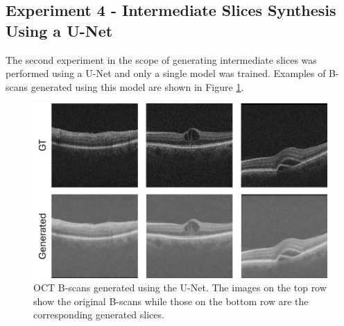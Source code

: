 \subsection{Experiment 4 - Intermediate Slices Synthesis Using a U-Net}

The second experiment in the scope of generating intermediate slices was performed using a U-Net and only a single model was trained. Examples of B-scans generated using this model are shown in Figure \ref{fig:GenerativeUNetResults}.

\begin{figure}[!ht]
	\centering	\includegraphics[width=1.0\linewidth]{figures/GenerativeUNetResults.png}
	\caption{OCT B-scans generated using the U-Net. The images on the top row show the original B-scans while those on the bottom row are the corresponding generated slices.}
	\label{fig:GenerativeUNetResults}
\end{figure}

